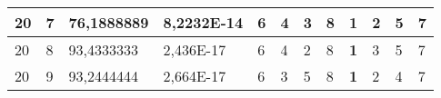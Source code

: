\documentclass[conference]{IEEEtran}
\begin{document}
\begin{table*}[]
\begin{tabular}{|llll|llllllll|}
\multicolumn{1}{|l|}{20}                                                    & \multicolumn{1}{l|}{7}                                                        & \multicolumn{1}{l|}{76,1888889}                                                   & 8,2232E-14                     & \multicolumn{1}{l|}{6}                                                  & \multicolumn{1}{l|}{4}                                                  & \multicolumn{1}{l|}{3}                                                  & \multicolumn{1}{l|}{8}                                                  & \multicolumn{1}{l|}{\textbf{1}}                                         & \multicolumn{1}{l|}{2}                                                  & \multicolumn{1}{l|}{5}                                                  & 7                          \\ \hline
\multicolumn{1}{|l|}{20}                                                    & \multicolumn{1}{l|}{8}                                                        & \multicolumn{1}{l|}{93,4333333}                                                   & 2,436E-17                      & \multicolumn{1}{l|}{6}                                                  & \multicolumn{1}{l|}{4}                                                  & \multicolumn{1}{l|}{2}                                                  & \multicolumn{1}{l|}{8}                                                  & \multicolumn{1}{l|}{\textbf{1}}                                         & \multicolumn{1}{l|}{3}                                                  & \multicolumn{1}{l|}{5}                                                  & 7                          \\ \hline
\multicolumn{1}{|l|}{20}                                                    & \multicolumn{1}{l|}{9}                                                        & \multicolumn{1}{l|}{93,2444444}                                                   & 2,664E-17                      & \multicolumn{1}{l|}{6}                                                  & \multicolumn{1}{l|}{3}                                                  & \multicolumn{1}{l|}{5}                                                  & \multicolumn{1}{l|}{8}                                                  & \multicolumn{1}{l|}{\textbf{1}}                                         & \multicolumn{1}{l|}{2}                                                  & \multicolumn{1}{l|}{4}                                                  & 7                          \\ \hline
\end{tabular}
\end{table*}
\end{document}
